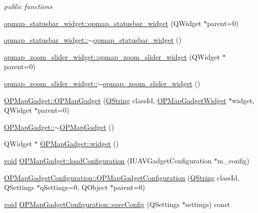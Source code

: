 \begin{DoxyCompactItemize}
\begin{DoxyCompactList}\small\item\em public functions \end{DoxyCompactList}\item 
\hyperlink{group___o_p_map_plugin_gacb2a078a376c25f8ca59214a7a231122}{opmap\-\_\-statusbar\-\_\-widget\-::opmap\-\_\-statusbar\-\_\-widget} (\-Q\-Widget $\ast$parent=0)
\item 
\hyperlink{group___o_p_map_plugin_gaf9e51f27e900dce668581330be2f272f}{opmap\-\_\-statusbar\-\_\-widget\-::$\sim$opmap\-\_\-statusbar\-\_\-widget} ()
\item 
\hyperlink{group___o_p_map_plugin_ga95e119b3d479e4740f8231bef84b59ac}{opmap\-\_\-zoom\-\_\-slider\-\_\-widget\-::opmap\-\_\-zoom\-\_\-slider\-\_\-widget} (\-Q\-Widget $\ast$parent=0)
\item 
\hyperlink{group___o_p_map_plugin_gab379eba250616b76de62dd392fa0e14d}{opmap\-\_\-zoom\-\_\-slider\-\_\-widget\-::$\sim$opmap\-\_\-zoom\-\_\-slider\-\_\-widget} ()
\item 
\hyperlink{group___o_p_map_plugin_ga6782261a51cde76c6b7fd104e0fc8607}{\-O\-P\-Map\-Gadget\-::\-O\-P\-Map\-Gadget} (\hyperlink{group___u_a_v_objects_plugin_gab9d252f49c333c94a72f97ce3105a32d}{\-Q\-String} class\-Id, \hyperlink{class_o_p_map_gadget_widget}{\-O\-P\-Map\-Gadget\-Widget} $\ast$widget, \-Q\-Widget $\ast$parent=0)
\item 
\hyperlink{group___o_p_map_plugin_ga041e6faec573a7770cc9ddfdf8694a5e}{\-O\-P\-Map\-Gadget\-::$\sim$\-O\-P\-Map\-Gadget} ()
\item 
\-Q\-Widget $\ast$ \hyperlink{group___o_p_map_plugin_ga4c0dd792243fff2dc45fd98929145d27}{\-O\-P\-Map\-Gadget\-::widget} ()
\item 
\hyperlink{group___u_a_v_objects_plugin_ga444cf2ff3f0ecbe028adce838d373f5c}{void} \hyperlink{group___o_p_map_plugin_ga8a10d4d6d7feb8ab2c2dd928cc46c260}{\-O\-P\-Map\-Gadget\-::load\-Configuration} (\-I\-U\-A\-V\-Gadget\-Configuration $\ast$m\-\_\-config)
\item 
\hyperlink{group___o_p_map_plugin_gad087f5e0479a0571692363c3771744be}{\-O\-P\-Map\-Gadget\-Configuration\-::\-O\-P\-Map\-Gadget\-Configuration} (\hyperlink{group___u_a_v_objects_plugin_gab9d252f49c333c94a72f97ce3105a32d}{\-Q\-String} class\-Id, \-Q\-Settings $\ast$q\-Settings=0, \-Q\-Object $\ast$parent=0)
\item 
\hyperlink{group___u_a_v_objects_plugin_ga444cf2ff3f0ecbe028adce838d373f5c}{void} \hyperlink{group___o_p_map_plugin_ga6bbc8206c2e47f0a2fbee16ae3714fb1}{\-O\-P\-Map\-Gadget\-Configuration\-::save\-Config} (\-Q\-Settings $\ast$settings) const 

\end{DoxyCompactItemize}
